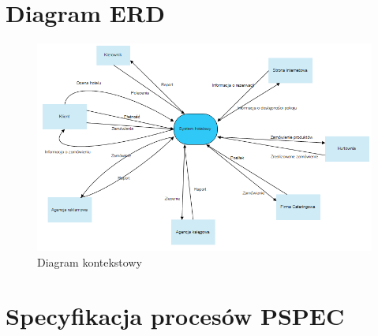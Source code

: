 \documentclass[a4paper, 11pt]{article}
\begin{document}
	
	
	
	
	\section{Diagram ERD}
	\indent
	\begin{figure}[H]%
			\includegraphics[scale=0.8]{Img/kontekstowy.png}
			\caption{Diagram kontekstowy}
	\end{figure}
	
	
	
	
	\newpage
	\section{Specyfikacja procesów PSPEC}
\end{document}
